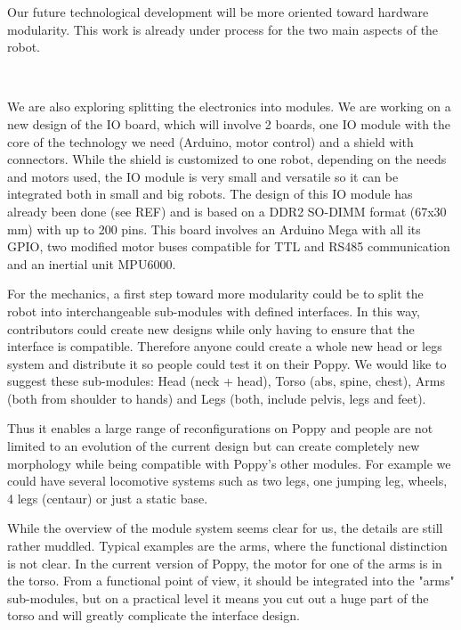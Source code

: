 Our future technological development will be more oriented toward hardware modularity. This work is already under process for the two main aspects of the robot.

\begin{figure}[tb]
\centering
    \hfil
     \\
    \caption{}
    \label{fig:poppy-electronic-modularity}
\end{figure}

We are also exploring splitting the electronics into modules. We are working on a new design of the IO board, which will involve 2 boards, one IO module with the core of the technology we need (Arduino, motor control) and a shield with connectors.
While the shield is customized to one robot, depending on the needs and motors used, the IO module is very small and versatile so it can be integrated both in small and big robots.
The design of this IO module has already been done (see REF) and is based on a DDR2 SO-DIMM format (67x30 mm) with up to 200 pins. This board involves an Arduino Mega with all its GPIO, two modified motor buses compatible for TTL and RS485 communication and an inertial unit MPU6000.


For the mechanics, a first step toward more modularity could be to split the robot into interchangeable sub-modules with defined interfaces. In this way, contributors could create new designs while only having to ensure that the interface is compatible. Therefore anyone could create a whole new head or legs system and distribute it so people could test it on their Poppy.
We would like to suggest these sub-modules: Head (neck + head), Torso (abs, spine, chest), Arms (both from shoulder to hands) and Legs (both, include pelvis, legs and feet).

Thus it enables a large range of reconfigurations on Poppy and people are not limited to an evolution of the current design but can create completely new morphology while being compatible with Poppy's other modules.
For example we could have several locomotive systems such as two legs, one jumping leg, wheels, 4 legs (centaur) or just a static base.

While the overview of the module system seems clear for us, the details are still rather muddled. Typical examples are the arms, where the functional distinction is not clear. In the current version of Poppy, the motor for one of the arms is in the torso. From a functional point of view, it should be integrated into the "arms" sub-modules, but on a practical level it means you cut out a huge part of the torso and will greatly complicate the interface design.

